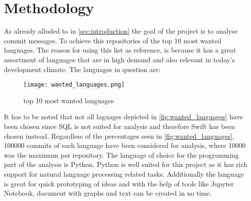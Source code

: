 \section{Methodology}
\label{sec:methodology}

As already alluded to in \autoref{sec:introduction} the goal of the project is to
analyse commit messages. To achieve this repositories of the top 10 most
wanted languages. The reason for using this list as reference, is because it
has a great assortment of languages that are in high demand and also relevant
in today's development climate. The languages in question are:

\begin{figure}[H]
  \centering
  \texttt{[image: wanted\_languages.png]}
  \caption{top 10 most wanted languages \cite{so-survey}}
  \label{fig:wanted_languages}
\end{figure}

It has to be noted that not all laguages depicted in
\autoref{fig:wanted_languages} have been chosen since SQL is not suited for
analysis and therefore Swift has been chosen instead. Regardless of the
percentages seen in \autoref{fig:wanted_languages}, 100000 commits of each
language have been considered for analysis, where 10000 was the maximum per
repository. The language of choice for the programming part of the analysis
is Python. Python is well suited for this project as it has rich support for
natural language processing related tasks. Additionally the language is great
for quick prototyping of ideas and with the help of tools like Jupyter
Notebook, document with graphs and text can be created in no time.

